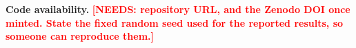 \documentclass[graybox]{svmult}
\newcommand{\NEEDS}[1]{\textcolor{red}{\textbf{[NEEDS: #1]}}}
\begin{document}
\noindent\textbf{Code availability.}
\NEEDS{repository URL, and the Zenodo DOI once minted. State the fixed random
seed used for the reported results, so someone can reproduce them.}



\end{document}
